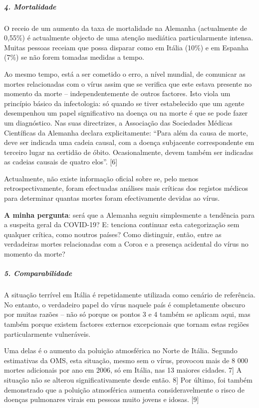 \hypertarget{4-mortalidade}{%
\subparagraph{\texorpdfstring{\textbf{4.
Mortalidade}}{4. Mortalidade}}\label{4-mortalidade}}

O receio de um aumento da taxa de mortalidade na Alemanha (actualmente
de 0,55\%) é actualmente objecto de uma atenção mediática
particularmente intensa. Muitas pessoas receiam que possa disparar como
em Itália (10\%) e em Espanha (7\%) se não forem tomadas medidas a
tempo.

Ao mesmo tempo, está a ser cometido o erro, a nível mundial, de
comunicar as mortes relacionadas com o vírus assim que se verifica que
este estava presente no momento da morte -- independentemente de outros
factores. Isto viola um princípio básico da infectologia: só quando se
tiver estabelecido que um agente desempenhou um papel significativo na
doença ou na morte é que se pode fazer um diagnóstico. Nas suas
directrizes, a Associação das Sociedades Médicas Científicas da Alemanha
declara explicitamente: ``Para além da causa de morte, deve ser indicada
uma cadeia causal, com a doença subjacente correspondente em terceiro
lugar na certidão de óbito. Ocasionalmente, devem também ser indicadas
as cadeias causais de quatro elos''. {[}6{]}

Actualmente, não existe informação oficial sobre se, pelo menos
retrospectivamente, foram efectuadas análises mais críticas dos registos
médicos para determinar quantas mortes foram efectivamente devidas ao
vírus.

\textbf{A minha pergunta}: será que a Alemanha seguiu simplesmente a
tendência para a suspeita geral da COVID-19? E: tenciona continuar esta
categorização sem qualquer crítica, como noutros países? Como
distinguir, então, entre as verdadeiras mortes relacionadas com a Coroa
e a presença acidental do vírus no momento da morte?

\hypertarget{5-comparabilidade}{%
\subparagraph{\texorpdfstring{\textbf{5.
Comparabilidade}}{5. Comparabilidade}}\label{5-comparabilidade}}

A situação terrível em Itália é repetidamente utilizada como cenário de
referência. No entanto, o verdadeiro papel do vírus naquele país é
completamente obscuro por muitas razões -- não só porque os pontos 3 e 4
também se aplicam aqui, mas também porque existem factores externos
excepcionais que tornam estas regiões particularmente vulneráveis.

Uma delas é o aumento da poluição atmosférica no Norte de Itália.
Segundo estimativas da OMS, esta situação, mesmo sem o vírus, provocou
mais de 8 000 mortes adicionais por ano em 2006, só em Itália, nas 13
maiores cidades. 7{]} A situação não se alterou significativamente desde
então. 8{]} Por último, foi também demonstrado que a poluição
atmosférica aumenta consideravelmente o risco de doenças pulmonares
virais em pessoas muito jovens e idosas. {[}9{]}

